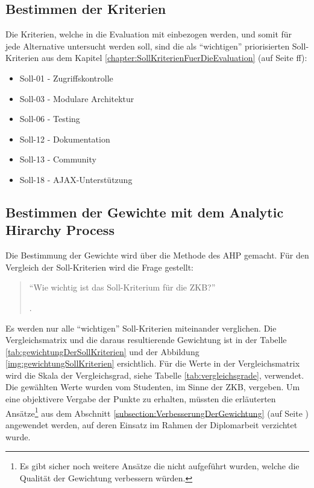   \subsection{Bestimmen der Kriterien}
  
  Die Kriterien, welche in die Evaluation mit einbezogen werden, und somit für
  jede Alternative untersucht werden soll, sind die als ``wichtigen''
  priorisierten Soll-Kriterien aus dem Kapitel
  \ref{chapter:SollKriterienFuerDieEvaluation}
   (auf Seite
  \pageref{chapter:SollKriterienFuerDieEvaluation}ff):
  
  \begin{itemize}
    \item Soll-01 - Zugriffskontrolle
    \item Soll-03 - Modulare Architektur
    \item Soll-06 - Testing
    \item Soll-12 - Dokumentation
    \item Soll-13 - Community
    \item Soll-18 - AJAX-Unterstützung
  \end{itemize}
  
  \subsection{Bestimmen der Gewichte mit dem Analytic Hirarchy Process}
  
  Die Bestimmung der Gewichte wird über die Methode des \ac{AHP} gemacht. Für
  den Vergleich der Soll-Kriterien wird die Frage gestellt:
  
  \begin{quote}
  \begin{itshape}``Wie wichtig ist das Soll-Kriterium für die
  \ac{ZKB}?''\end{itshape}.
  \end{quote}
  
  Es werden nur alle ``wichtigen'' Soll-Kriterien miteinander verglichen. Die
  Vergleichsmatrix und die daraus resultierende Gewichtung ist in der Tabelle
  \ref{tab:gewichtungDerSollKriterien} und der Abbildung
  \ref{img:gewichtungSollKriterien} ersichtlich. Für die Werte in der
  Vergleichsmatrix wird die Skala der Vergleichsgrad, siehe Tabelle
  \ref{tab:vergleichsgrade}, verwendet. Die gewählten Werte wurden vom
  Studenten, im Sinne der \ac{ZKB}, vergeben. Um eine objektivere Vergabe der
  Punkte zu erhalten, müssten die erläuterten Ansätze\footnote{Es gibt sicher
  noch weitere Ansätze die nicht aufgeführt wurden, welche die Qualität der
  Gewichtung verbessern würden.} aus dem Abschnitt
  \ref{subsection:VerbesserungDerGewichtung}
   (auf Seite
  \pageref{subsection:VerbesserungDerGewichtung}) angewendet werden, auf deren
  Einsatz im Rahmen der Diplomarbeit verzichtet wurde.
  
